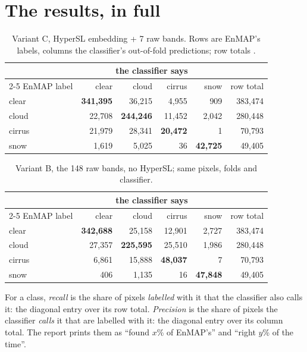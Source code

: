 \section{The results, in full}\label{sec:hslcloud:results}

\begin{table}[htbp]
\centering\small
\begin{tabular}{@{}lrrrrr@{}}
\toprule
& \multicolumn{4}{c}{the classifier says} & \\
\cmidrule(lr){2-5}
EnMAP label & clear & cloud & cirrus & snow & row total \\
\midrule
clear & \textbf{341,395} & 36,215 & 4,955 & 909 & 383,474 \\
cloud & 22,708 & \textbf{244,246} & 11,452 & 2,042 & 280,448 \\
cirrus & 21,979 & 28,341 & \textbf{20,472} & 1 & 70,793 \\
snow & 1,619 & 5,025 & 36 & \textbf{42,725} & 49,405 \\
\bottomrule
\end{tabular}
\caption{Variant C, HyperSL embedding + 7 raw bands. Rows are EnMAP's labels, columns the classifier's out-of-fold
predictions; row totals \tagC.}
\label{tab:hslcloud:c}
\end{table}

\begin{table}[htbp]
\centering\small
\begin{tabular}{@{}lrrrrr@{}}
\toprule
& \multicolumn{4}{c}{the classifier says} & \\
\cmidrule(lr){2-5}
EnMAP label & clear & cloud & cirrus & snow & row total \\
\midrule
clear & \textbf{342,688} & 25,158 & 12,901 & 2,727 & 383,474 \\
cloud & 27,357 & \textbf{225,595} & 25,510 & 1,986 & 280,448 \\
cirrus & 6,861 & 15,888 & \textbf{48,037} & 7 & 70,793 \\
snow & 406 & 1,135 & 16 & \textbf{47,848} & 49,405 \\
\bottomrule
\end{tabular}
\caption{Variant B, the 148 raw bands, no HyperSL; same pixels, folds and classifier.}
\label{tab:hslcloud:b}
\end{table}

\begin{definition}
For a class, \emph{recall} is the share of pixels \emph{labelled} with it that the classifier also calls
it: the diagonal entry over its row total. \emph{Precision} is the share of pixels the classifier
\emph{calls} it that are labelled with it: the diagonal entry over its column total. The report prints them as ``found
$x$\% of EnMAP's'' and ``right $y$\% of the time''.
\end{definition}

